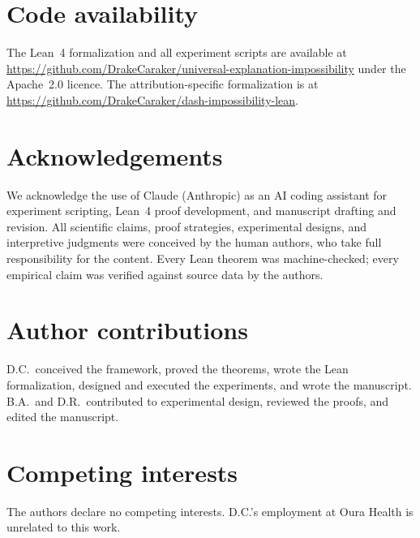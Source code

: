 \documentclass[11pt]{article}
\begin{document}
\section*{Code availability}
The Lean~4 formalization and all experiment scripts are available at
\url{https://github.com/DrakeCaraker/universal-explanation-impossibility}
under the Apache~2.0 licence.  The attribution-specific formalization is
at \url{https://github.com/DrakeCaraker/dash-impossibility-lean}.

\section*{Acknowledgements}
We acknowledge the use of Claude (Anthropic) as an AI coding assistant
for experiment scripting, Lean~4 proof development, and manuscript
drafting and revision.  All scientific claims, proof strategies,
experimental designs, and interpretive judgments were conceived by the
human authors, who take full responsibility for the content.  Every
Lean theorem was machine-checked; every empirical claim was verified
against source data by the authors.

\section*{Author contributions}
D.C.\ conceived the framework, proved the theorems, wrote the Lean
formalization, designed and executed the experiments, and wrote the
manuscript.  B.A.\ and D.R.\ contributed to experimental design,
reviewed the proofs, and edited the manuscript.

\section*{Competing interests}
The authors declare no competing interests. D.C.'s employment at Oura
Health is unrelated to this work.




\end{document}
